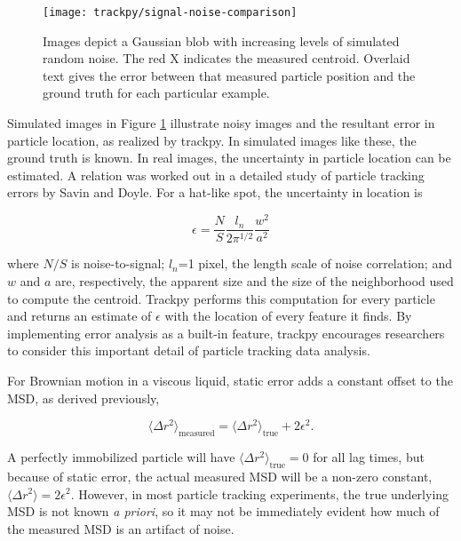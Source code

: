    \begin{figure}
    \centering
    \texttt{[image: trackpy/signal-noise-comparison]}
    \caption[Images depict a Gaussian blob with increasing levels of simulated random noise, showing the error in centroid location.]{\label{fig:static-error}Images depict a Gaussian blob with increasing levels of simulated random noise. The red X indicates the measured centroid. Overlaid text gives the error between that measured particle position and the ground truth for each particular example.}
    \end{figure}
    
Simulated images in Figure \ref{fig:static-error} illustrate noisy images and the resultant error in particle location, as realized by trackpy. In simulated images like these, the ground truth is known. In real images, the uncertainty in particle location can be estimated. A relation was worked out in a detailed study of particle tracking errors by Savin and Doyle\cite{Savin2005}. For a hat-like spot, the uncertainty in location is

\begin{equation}
\epsilon = \frac{N}{S}\frac{l_n}{2\pi^{1/2}}\frac{w^2}{a^2}
\end{equation}

\noindent where $N/S$ is noise-to-signal; $l_n$=1 pixel, the length scale of noise correlation; and $w$ and $a$ are, respectively, the apparent size and the size of the neighborhood used to compute the centroid. Trackpy performs this computation for every particle and returns an estimate of $\epsilon$ with the location of every feature it finds. By implementing error analysis as a built-in feature, trackpy encourages researchers to consider this important detail of particle tracking data analysis.

For Brownian motion in a viscous liquid, static error adds a constant offset to the MSD, as derived previously\cite{Martin2002a},

\begin{equation}
\langle \Delta r^2 \rangle_{\text{measured}} = \langle \Delta r^2 \rangle_{\text{true}} + 2\epsilon^2.
\end{equation}

\noindent A perfectly immobilized particle will have $\langle\Delta r^2\rangle_{\text{true}} = 0$ for all lag times, but because of static error, the actual measured MSD will be a non-zero constant, $\langle \Delta r^2 \rangle = 2\epsilon^2$\cite{Martin2002a,Crocker2007}. However, in most particle tracking experiments, the true underlying MSD is not known \emph{a priori}, so it may not be immediately evident how much of the measured MSD is an artifact of noise.

